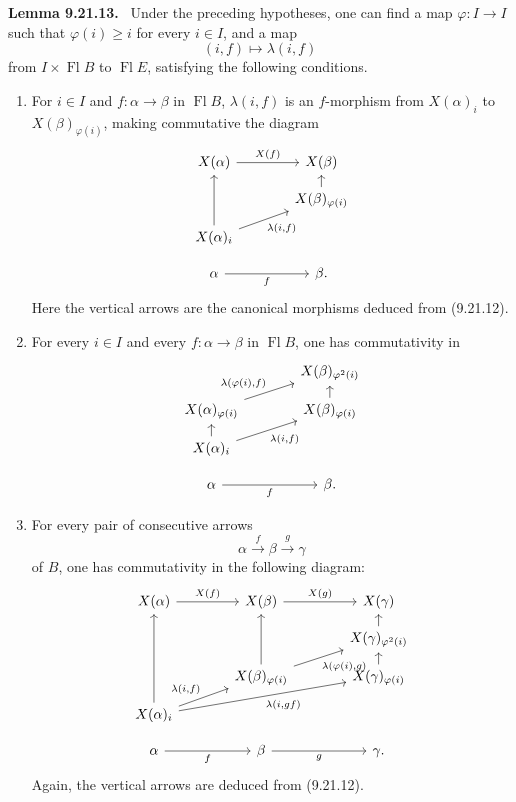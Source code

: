 \documentclass[11pt]{article}
\newcommand{\Fl}{\operatorname{Fl}}
\newenvironment{statement}[1]{\par\medskip\noindent\textbf{#1.}\ }{\par\medskip}
\begin{document}
\begin{statement}{Lemma 9.21.13}
Under the preceding hypotheses, one can find a map $\varphi:I\to I$ such that $\varphi(i)\geq i$ for every $i\in I$, and a map
\[
 (i,f)\longmapsto \lambda(i,f)
\]
from $I\times\Fl B$ to $\Fl E$, satisfying the following conditions.
\begin{enumerate}[label=\alph*)]
\item For $i\in I$ and $f:\alpha\to\beta$ in $\Fl B$, $\lambda(i,f)$ is an $f$-morphism from $X(\alpha)_i$ to $X(\beta)_{\varphi(i)}$, making commutative the diagram
\[
\begin{tikzcd}[column sep=large,row sep=small]
X(\alpha) \arrow[r,"{X(f)}"] & X(\beta)\\
& X(\beta)_{\varphi(i)} \arrow[u]\\
X(\alpha)_i \arrow[uu] \arrow[ru,"{\lambda(i,f)}"'] & \\
\alpha \arrow[r,"{f}"'] & \beta .
\end{tikzcd}
\]
Here the vertical arrows are the canonical morphisms deduced from (9.21.12).

\item For every $i\in I$ and every $f:\alpha\to\beta$ in $\Fl B$, one has commutativity in
\[
\begin{tikzcd}[column sep=large,row sep=small]
& X(\beta)_{\varphi^2(i)}\\
X(\alpha)_{\varphi(i)} \arrow[ru,"{\lambda(\varphi(i),f)}"] & X(\beta)_{\varphi(i)} \arrow[u]\\
X(\alpha)_i \arrow[ru,"{\lambda(i,f)}"'] \arrow[u] &\\
\alpha \arrow[r,"{f}"'] & \beta .
\end{tikzcd}
\]

\item For every pair of consecutive arrows
\[
 \alpha\xrightarrow{f}\beta\xrightarrow{g}\gamma
\]
of $B$, one has commutativity in the following diagram:
\[
\begin{tikzcd}[column sep=large,row sep=small]
X(\alpha) \arrow[r,"{X(f)}"] & X(\beta) \arrow[r,"{X(g)}"] & X(\gamma)\\
& & X(\gamma)_{\varphi^2(i)} \arrow[u]\\
& X(\beta)_{\varphi(i)} \arrow[uu] \arrow[ru,"{\lambda(\varphi(i),g)}"'] & X(\gamma)_{\varphi(i)} \arrow[u]\\
X(\alpha)_i \arrow[uuu] \arrow[ru,"{\lambda(i,f)}"] \arrow[rru,"{\lambda(i,gf)}"'] & &\\
\alpha \arrow[r,"{f}"'] & \beta \arrow[r,"{g}"'] & \gamma .
\end{tikzcd}
\]
Again, the vertical arrows are deduced from (9.21.12).
\end{enumerate}
\end{statement}
\end{document}
